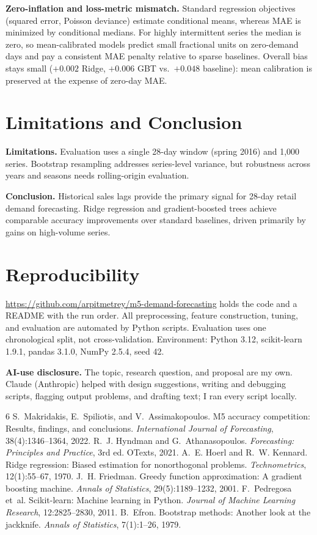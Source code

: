 \documentclass{article}
\begin{document}
\textbf{Zero-inflation and loss-metric mismatch.} Standard regression objectives (squared error, Poisson deviance) estimate conditional means, whereas MAE is minimized by conditional medians. For highly intermittent series the median is zero, so mean-calibrated models predict small fractional units on zero-demand days and pay a consistent MAE penalty relative to sparse baselines. Overall bias stays small ($+0.002$ Ridge, $+0.006$ GBT vs.\ $+0.048$ baseline): mean calibration is preserved at the expense of zero-day MAE.

\section{Limitations and Conclusion}
\textbf{Limitations.} Evaluation uses a single 28-day window (spring 2016) and 1,000 series. Bootstrap resampling addresses series-level variance, but robustness across years and seasons needs rolling-origin evaluation.

\textbf{Conclusion.} Historical sales lags provide the primary signal for 28-day retail demand forecasting. Ridge regression and gradient-boosted trees achieve comparable accuracy improvements over standard baselines, driven primarily by gains on high-volume series.

\section{Reproducibility}
\url{https://github.com/arpitmetrey/m5-demand-forecasting} holds the code and a README with the run order. All preprocessing, feature construction, tuning, and evaluation are automated by Python scripts. Evaluation uses one chronological split, not cross-validation. Environment: Python 3.12, scikit-learn 1.9.1, pandas 3.1.0, NumPy 2.5.4, seed 42.

\textbf{AI-use disclosure.} The topic, research question, and proposal are my own. Claude (Anthropic) helped with design suggestions, writing and debugging scripts, flagging output problems, and drafting text; I ran every script locally.

\begin{thebibliography}{6}
 S.~Makridakis, E.~Spiliotis, and V.~Assimakopoulos. M5 accuracy competition: Results, findings, and conclusions. \emph{International Journal of Forecasting}, 38(4):1346--1364, 2022.
 R.~J. Hyndman and G.~Athanasopoulos. \emph{Forecasting: Principles and Practice}, 3rd ed. OTexts, 2021.
 A.~E. Hoerl and R.~W. Kennard. Ridge regression: Biased estimation for nonorthogonal problems. \emph{Technometrics}, 12(1):55--67, 1970.
 J.~H. Friedman. Greedy function approximation: A gradient boosting machine. \emph{Annals of Statistics}, 29(5):1189--1232, 2001.
 F.~Pedregosa et~al. Scikit-learn: Machine learning in Python. \emph{Journal of Machine Learning Research}, 12:2825--2830, 2011.
 B.~Efron. Bootstrap methods: Another look at the jackknife. \emph{Annals of Statistics}, 7(1):1--26, 1979.
\end{thebibliography}
\end{document}
